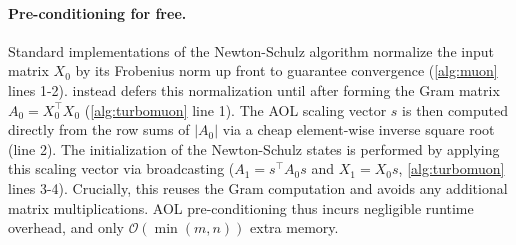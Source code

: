 \paragraph{Pre-conditioning for free.}
Standard implementations of the Newton-Schulz algorithm normalize the input matrix $X_0$ by its Frobenius norm up front to guarantee convergence (\cref{alg:muon} lines 1-2).
\turbomuon instead defers this normalization until after forming the Gram matrix $A_0 = X_0^\top X_0$ (\cref{alg:turbomuon} line 1). 
The AOL scaling vector $s$ is then computed directly from the row sums of $|A_0|$ via a cheap element-wise inverse square root (line 2).
The initialization of the Newton-Schulz states is performed by
applying this scaling vector via broadcasting ($A_1 = s^\top A_0 s$ and $X_1 = X_0 s$, \cref{alg:turbomuon} lines 3-4). 
Crucially, this reuses the Gram computation and avoids any additional matrix multiplications. AOL pre-conditioning thus incurs negligible runtime overhead, and only $\mathcal{O}(\min(m,n))$ extra memory.

